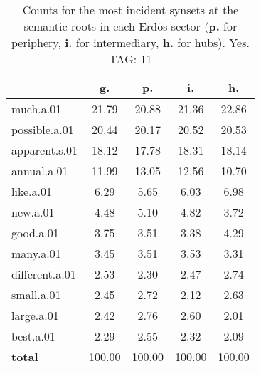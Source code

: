 \begin{table}[h!]
\begin{center}
\begin{tabular}{| l || c | c | c | c |}\hline
 & {\bf g.} & {\bf p.} & {\bf i.} & {\bf h.} \\\hline\hline
much.a.01 & 21.79  & 20.88  & 21.36  & 22.86 \\\hline
possible.a.01 & 20.44  & 20.17  & 20.52  & 20.53 \\\hline
apparent.s.01 & 18.12  & 17.78  & 18.31  & 18.14 \\\hline
annual.a.01 & 11.99  & 13.05  & 12.56  & 10.70 \\\hline
like.a.01 & 6.29  & 5.65  & 6.03  & 6.98 \\\hline
new.a.01 & 4.48  & 5.10  & 4.82  & 3.72 \\\hline
good.a.01 & 3.75  & 3.51  & 3.38  & 4.29 \\\hline
many.a.01 & 3.45  & 3.51  & 3.53  & 3.31 \\\hline
different.a.01 & 2.53  & 2.30  & 2.47  & 2.74 \\\hline
small.a.01 & 2.45  & 2.72  & 2.12  & 2.63 \\\hline
large.a.01 & 2.42  & 2.76  & 2.60  & 2.01 \\\hline
best.a.01 & 2.29  & 2.55  & 2.32  & 2.09 \\\hline\hline
{{\bf total}} & 100.00  & 100.00  & 100.00  & 100.00 \\\hline
\end{tabular}
\caption{Counts for the most incident synsets at the semantic roots in each Erd\"os sector ({\bf p.} for periphery, {\bf i.} for intermediary, {\bf h.} for hubs). Yes. TAG: 11}
\end{center}
\end{table}